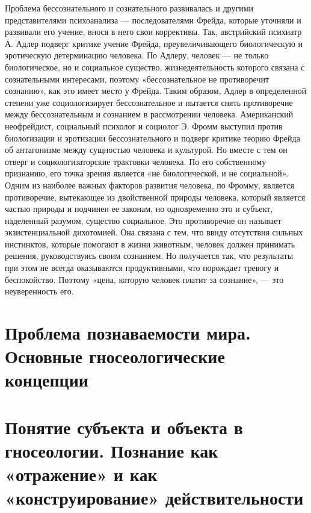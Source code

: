 \documentclass[12pt]{article}
\begin{document}
Проблема бессознательного и сознательного развивалась и другими представителями психоанализа —
последователями Фрейда, которые уточняли и развивали его учение, внося в него свои коррективы. Так,
австрийский психиатр А. Адлер подверг критике учение Фрейда, преувеличивающего биологическую и
эротическую детерминацию человека. По Адлеру, человек — не только биологическое, но и социальное
существо, жизнедеятельность которого связана с сознательными интересами, поэтому «бессознательное не
противоречит сознанию», как это имеет место у Фрейда. Таким образом, Адлер в определенной степени уже
социологизирует бессознательное и пытается снять противоречие между бессознательным и сознанием в
рассмотрении человека.
Американский неофрейдист, социальный психолог и социолог Э. Фромм выступил против биологизации и
эротизации бессознательного и подверг критике теорию Фрейда об антагонизме между сущностью человека и
культурой. Но вместе с тем он отверг и социологизаторские трактовки человека. По его собственному
признанию, его точка зрения является «не биологической, и не социальной». Одним из наиболее важных
факторов развития человека, по Фромму, является противоречие, вытекающее из двойственной природы
человека, который является частью природы и подчинен ее законам, но одновременно это и субъект,
наделенный разумом, существо социальное. Это противоречие он называет экзистенциальной дихотомией. Она
связана с тем, что ввиду отсутствия сильных инстинктов, которые помогают в жизни животным, человек
должен принимать решения, руководствуясь своим сознанием. Но получается так, что результаты при этом не
всегда оказываются продуктивными, что порождает тревогу и беспокойство. Поэтому «цена, которую человек
платит за сознание», — это неуверенность его.


\newpage
\section{Проблема познаваемости мира. Основные гносеологические концепции}


\newpage
\section{Понятие субъекта и объекта в гносеологии. Познание как «отражение» и как «конструирование» действительности}
\end{document}
